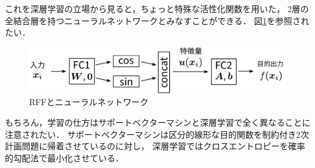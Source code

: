 これを深層学習の立場から見ると，ちょっと特殊な活性化関数を用いた，
2層の全結合層を持つニューラルネットワークとみなすことができる．
図\ref{fig:rff_svc_as_dnn}を参照されたい．

\begin{figure}[t]
    \centerline{\includegraphics[width=350pt]{figures/rff_svc_as_dnn.pdf}}
    \caption{RFFとニューラルネットワーク}
    \label{fig:rff_svc_as_dnn}
\end{figure}

もちろん，学習の仕方はサポートベクターマシンと深層学習で全く異なることに注意されたい．
サポートベクターマシンは区分的線形な目的関数を制約付き2次計画問題に帰着させているのに対し，
深層学習ではクロスエントロピーを確率的勾配法で最小化させている．

